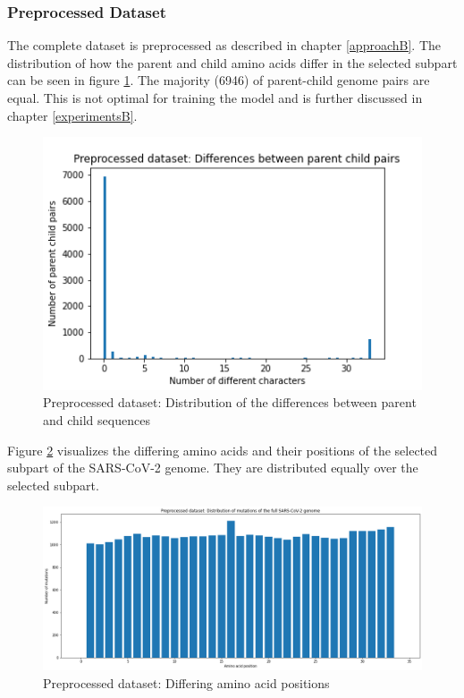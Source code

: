 \newpage
\subsubsection{Preprocessed Dataset} \label{experimentsAb}

The complete dataset is preprocessed as described in chapter \ref{approachB}. The distribution of how the parent and child amino acids differ in the selected subpart can be seen in figure \ref{preprocessedDistributionDifferencesParentChild}. The majority (6946) of parent-child genome pairs are equal. This is not optimal for training the model and is further discussed in chapter \ref{experimentsB}. 

\begin{figure}[ht]
	\centering
	\includegraphics[width=0.6\linewidth]{figures/preprocessedDistributionDifferencesParentChild.png}
	\caption{Preprocessed dataset: Distribution of the differences between parent and child sequences \cite{own representation}}
	\label{preprocessedDistributionDifferencesParentChild}
\end{figure}

Figure \ref{preprocessedMutatedGeneticLoci} visualizes the differing amino acids and their positions of the selected subpart of the \ac{SARS-CoV-2} genome. They are distributed equally over the selected subpart.

\begin{figure}[ht]
	\centering
	\includegraphics[width=0.9\linewidth]{figures/preprocessedMutatedGeneticLoci.png}
	\caption{Preprocessed dataset: Differing amino acid positions \cite{own representation}}
	\label{preprocessedMutatedGeneticLoci}
\end{figure}

